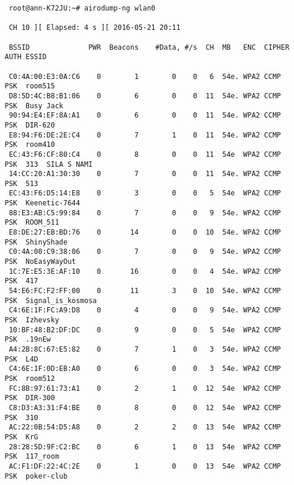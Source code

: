 \documentclass[10pt,a4paper]{report}
\begin{document}
\begin{verbatim}
 root@ann-K72JU:~# airodump-ng wlan0

 CH 10 ][ Elapsed: 4 s ][ 2016-05-21 20:11                                         
                                                                                                                      
 BSSID              PWR  Beacons    #Data, #/s  CH  MB   ENC  CIPHER AUTH ESSID                                       
                                                                                                                      
 C0:4A:00:E3:0A:C6    0        1        0    0   6  54e. WPA2 CCMP   PSK  room515                                     
 D8:5D:4C:B8:B1:06    0        6        0    0  11  54e. WPA2 CCMP   PSK  Busy Jack                                   
 90:94:E4:EF:8A:A1    0        6        0    0  11  54e. WPA2 CCMP   PSK  DIR-620                                     
 E8:94:F6:DE:2E:C4    0        7        1    0  11  54e. WPA2 CCMP   PSK  room410                                     
 EC:43:F6:CF:80:C4    0        8        0    0  11  54e  WPA2 CCMP   PSK  313  SILA S NAMI                            
 14:CC:20:A1:30:30    0        7        0    0  11  54e. WPA2 CCMP   PSK  513                                         
 EC:43:F6:D5:14:E8    0        3        0    0   5  54e  WPA2 CCMP   PSK  Keenetic-7644                                
 88:E3:AB:C5:99:84    0        7        0    0   9  54e. WPA2 CCMP   PSK  ROOM_511                                    
 E8:DE:27:EB:BD:76    0       14        0    0  10  54e. WPA2 CCMP   PSK  ShinyShade                                   
 C0:4A:00:C9:38:06    0        7        0    0   9  54e. WPA2 CCMP   PSK  NoEasyWayOut                                 
 1C:7E:E5:3E:AF:10    0       16        0    0   4  54e. WPA2 CCMP   PSK  417                                          
 54:E6:FC:F2:FF:00    0       11        3    0  10  54e. WPA2 CCMP   PSK  Signal_is_kosmosa                            
 C4:6E:1F:FC:A9:D8    0        4        0    0   9  54e. WPA2 CCMP   PSK  Izhevsky                                     
 10:BF:48:B2:DF:DC    0        9        0    0   5  54e  WPA2 CCMP   PSK  .19nEw                                       
 A4:2B:8C:67:E5:82    0        7        1    0   3  54e. WPA2 CCMP   PSK  L4D                                          
 C4:6E:1F:0D:EB:A0    0        6        0    0   3  54e. WPA2 CCMP   PSK  room512                                      
 FC:8B:97:61:73:A1    0        2        1    0  12  54e  WPA2 CCMP   PSK  DIR-300                                      
 C8:D3:A3:31:F4:BE    0        8        0    0  12  54e  WPA2 CCMP   PSK  310                                          
 AC:22:0B:54:D5:A8    0        2        2    0  13  54e  WPA2 CCMP   PSK  KrG                                         
 28:28:5D:9F:C2:BC    0        6        1    0  13  54e  WPA2 CCMP   PSK  117_room                                    
 AC:F1:DF:22:4C:2E    0        1        0    0  13  54e  WPA2 CCMP   PSK  poker-club      
 \end{verbatim}
\end{document}
